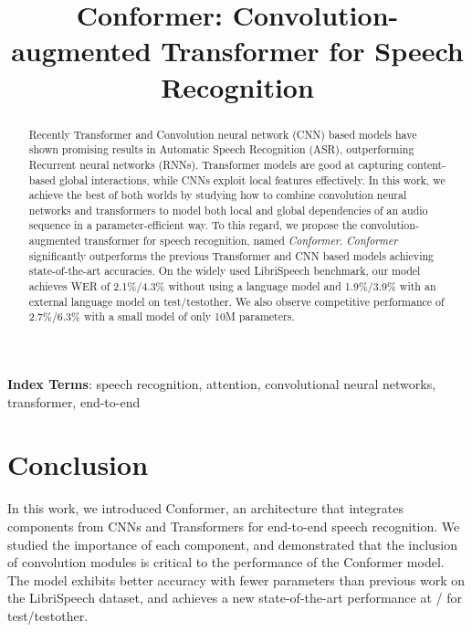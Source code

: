 \documentclass[a4paper]{article}
\title{Conformer: Convolution-augmented Transformer for Speech Recognition}
\begin{document}
\maketitle
\begin{abstract}
Recently Transformer and Convolution neural network (CNN) based models have shown promising results in Automatic Speech Recognition (ASR), outperforming Recurrent neural networks (RNNs). Transformer models are good at capturing content-based global interactions, while CNNs exploit local features effectively.
In this work, we achieve the best of both worlds by studying how to combine convolution neural networks and transformers to model both local and global dependencies of an audio sequence in a parameter-efficient way. To this regard, we propose the convolution-augmented transformer for speech recognition, named \textit{Conformer}. \textit{Conformer} significantly outperforms the previous Transformer and CNN based models achieving state-of-the-art accuracies. On the widely used LibriSpeech benchmark, our model achieves WER of 2.1\%/4.3\% without using a language model and 1.9\%/3.9\% with an external language model on test/testother. We also observe competitive performance of 2.7\%/6.3\% with a small model of only 10M parameters.

\end{abstract}
\noindent\textbf{Index Terms}: speech recognition, attention, convolutional neural networks, transformer, end-to-end





\section{Conclusion}
In this work,
we introduced Conformer, an architecture that integrates components from CNNs and Transformers for end-to-end speech recognition. We studied the importance of each component, and demonstrated that the inclusion of convolution modules is critical to the performance of the Conformer model.
The model exhibits better accuracy with fewer parameters than previous work on the LibriSpeech dataset, and achieves a new state-of-the-art performance at / for test/testother.





\end{document}
